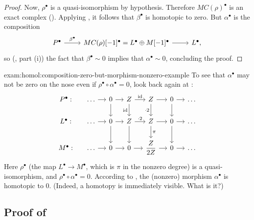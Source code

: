 \begin{proof}
  Now, $\rho^\bullet$ is a quasi-isomorphism by hypothesis. Therefore
  $MC(\rho)^\bullet$ is an exact complex (). Applying
  , it follows that $\beta^\bullet$ is
  homotopic to zero. But $\alpha^\bullet$ is the composition
  \[\begin{tikzcd}
      P^\bullet \arrow[r, "\beta^\bullet"] & MC(\rho)[-1]^\bullet =
      L^\bullet \oplus M[-1]^\bullet \arrow[r] & L^\bullet,
    \end{tikzcd}\] so
  (, part (i))
  the fact that $\beta^\bullet \sim 0$ implies that
  $\alpha^\bullet \sim 0$, concluding the proof.
\end{proof}

\begin{exam}{}{exam:homol:composition-zero-but-morphism-nonzero-example}
  To see that $\alpha^\bullet$ may not be zero on the nose even if
  $\rho^\bullet \circ \alpha^\bullet = 0$, look back again at
  :
  \[\begin{tikzcd}[column sep=small]
      P^\bullet: & \dots \arrow[r] & 0 \arrow[r] \arrow[d] & \Z
      \arrow[r, "\id"] \arrow[d, "\id"'] & \Z \arrow[r] \arrow[d,
      "\cdot 2"'] &
      0 \arrow[r] \arrow[d] & \dots \\
      L^\bullet: & \dots \arrow[r] & 0 \arrow[r] \arrow[d] & \Z
      \arrow[r, "\cdot 2"] \arrow[d] & \Z \arrow[r] \arrow[d, "\pi"] &
      0 \arrow[r] \arrow[d] & \dots \\
      M^\bullet: & \dots \arrow[r] & 0 \arrow[r] & 0 \arrow[r] &
      \dfrac{\Z}{2\Z} \arrow[r] & 0 \arrow[r] & \dots
    \end{tikzcd}\] Here $\rho^\bullet$ (the map
  $L^\bullet \to M^\bullet$, which is $\pi$ in the nonzero degree) is
  a quasi-isomorphism, and $\rho^\bullet \circ \alpha^\bullet =
  0$. According to , the (nonzero) morphism
  $\alpha^\bullet$ is homotopic to $0$. (Indeed, a homotopy is
  immediately visible.  What is it?)
\end{exam}

\subsection{Proof of }%
\label{subsec:homol:proof-of-theorem-5-9}

